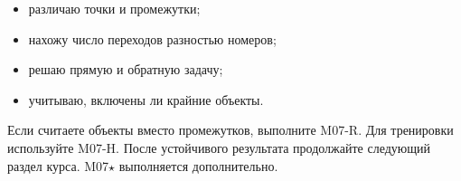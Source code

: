 \begin{reflectionbox}
  \begin{itemize}[label=\choicebox]
    \item различаю точки и промежутки;
    \item нахожу число переходов разностью номеров;
    \item решаю прямую и обратную задачу;
    \item учитываю, включены ли крайние объекты.
  \end{itemize}
\end{reflectionbox}

\begin{resultbox}
  Если считаете объекты вместо промежутков, выполните M07-R. Для тренировки
  используйте M07-H. После устойчивого результата продолжайте следующий
  раздел курса. M07\(\star\) выполняется дополнительно.
\end{resultbox}
